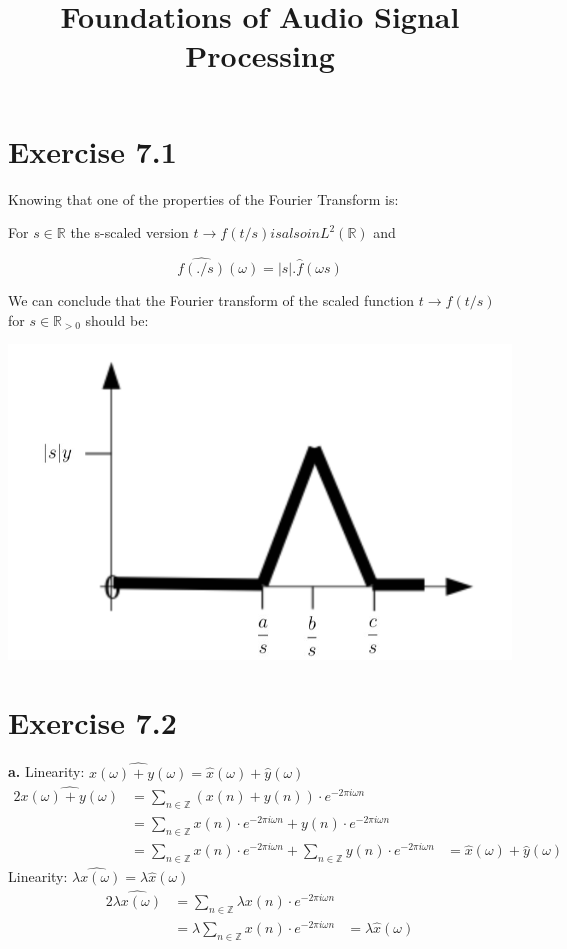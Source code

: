 \documentclass[12pt]{article}
\title{Foundations of Audio Signal Processing\\ \ass}
\author{\auth}
\newcommand{\inte}{\mathbb{Z}}
\newcommand{\een}{\ensuremath{e^{-2\pi i \omega n}}}
\begin{document}
	\maketitle
	\section*{Exercise 7.1}
	
	    Knowing that one of the properties of the Fourier Transform is:
	    
	    For $s\in \mathbb{R} $ the s-scaled version $t \rightarrow f(t/s) is also in L^{2}(\mathbb{R}) $ and
	    
	    $$ \widehat{f(./s)}(\omega) = |s|.\hat{f}(\omega s)$$
	    
	    We can conclude that the Fourier transform of the scaled function $ t \rightarrow f(t/s)$ for $s \in \mathbb{R}_{> 0}$ should be:
	    
	    \includegraphics[]{figure1.png}
	    
	\section*{Exercise 7.2}
	\textbf{a.} Linearity: $\widehat{x(\omega) + y(\omega)} = \hat{x}(\omega) + \hat{y}(\omega)$
	\begin{alignat*}{2}
		\widehat{x(\omega) + y(\omega)} &= \sum_{n \in \inte} (x(n) + y(n)) \cdot \een\\
		&= \sum_{n \in \inte} x(n) \cdot \een + y(n) \cdot \een\\
		&= \sum_{n \in \inte} x(n) \cdot \een + \sum_{n \in \inte} y(n) \cdot \een
		&= \hat{x}(\omega) + \hat{y}(\omega)
	\end{alignat*}
	Linearity: $\widehat{\lambda x(\omega)} = \lambda\hat{x}(\omega)$
	\begin{alignat*}{2}
		\widehat{\lambda x(\omega)} &= \sum_{n \in \inte} \lambda x(n) \cdot \een\\
		&= \lambda \sum_{n \in \inte} x(n) \cdot \een
		&= \lambda\hat{x}(\omega)
	\end{alignat*}
\end{document}
